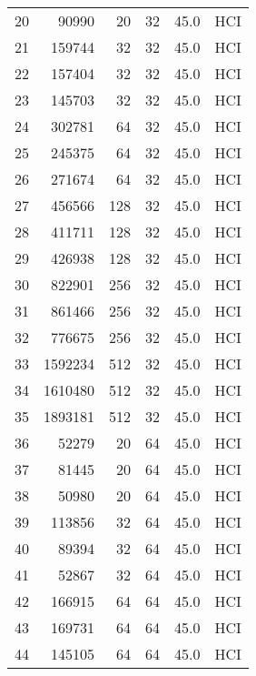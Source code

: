 \begin{longtable}{lrrrrl}
20  &     90990 &         20 &        32 &           45.0 &  HCI \\
21  &    159744 &         32 &        32 &           45.0 &  HCI \\
22  &    157404 &         32 &        32 &           45.0 &  HCI \\
23  &    145703 &         32 &        32 &           45.0 &  HCI \\
24  &    302781 &         64 &        32 &           45.0 &  HCI \\
25  &    245375 &         64 &        32 &           45.0 &  HCI \\
26  &    271674 &         64 &        32 &           45.0 &  HCI \\
27  &    456566 &        128 &        32 &           45.0 &  HCI \\
28  &    411711 &        128 &        32 &           45.0 &  HCI \\
29  &    426938 &        128 &        32 &           45.0 &  HCI \\
30  &    822901 &        256 &        32 &           45.0 &  HCI \\
31  &    861466 &        256 &        32 &           45.0 &  HCI \\
32  &    776675 &        256 &        32 &           45.0 &  HCI \\
33  &   1592234 &        512 &        32 &           45.0 &  HCI \\
34  &   1610480 &        512 &        32 &           45.0 &  HCI \\
35  &   1893181 &        512 &        32 &           45.0 &  HCI \\
36  &     52279 &         20 &        64 &           45.0 &  HCI \\
37  &     81445 &         20 &        64 &           45.0 &  HCI \\
38  &     50980 &         20 &        64 &           45.0 &  HCI \\
39  &    113856 &         32 &        64 &           45.0 &  HCI \\
40  &     89394 &         32 &        64 &           45.0 &  HCI \\
41  &     52867 &         32 &        64 &           45.0 &  HCI \\
42  &    166915 &         64 &        64 &           45.0 &  HCI \\
43  &    169731 &         64 &        64 &           45.0 &  HCI \\
44  &    145105 &         64 &        64 &           45.0 &  HCI \\

\end{longtable}
